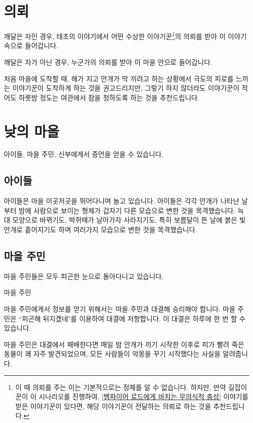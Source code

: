 \documentclass{report}
\begin{document}
	\section{의뢰}
	깨달은 자인 경우, 태초의 이야기에서 어떤 수상한 이야기꾼\footnote{\label{who-is-it}이 때 의뢰를 주는 이는 기본적으로는 정체를 알 수 없습니다. 하지만, 만약 길잡이꾼이 이 시나리오를 진행하여, \hyperlink{vamp-master}{[뱀파이어 로드에게 바치는 무의식적 충성]} 이야기를 받은 이야기꾼이 있다면, 해당 이야기꾼이 전달하는 의뢰로 하는 것을 추천드립니다.}의 의뢰를 받아 이 이야기 속으로 들어갑니다. 
	
	깨달은 자가 아닌 경우, 누군가의 의뢰를 받아 이 마을 안으로 들어갑니다.
	
	처음 마을에 도착할 때, 해가 지고 안개가 막 끼려고 하는 상황에서 극도의 피로를 느끼는 이야기꾼이 도착하게 하는 것을 권고드리지만, 그렇기 하지 않더라도 이야기꾼이 적어도 하룻밤 정도는 여관에서 잠을 청하도록 하는 것을 추천드립니다.
	
	\section{낮의 마을}
	아이들, 마을 주민, 신부에게서 증언을 얻을 수 있습니다.
	
	\subsection{아이들}
	아이들은 마을 이곳저곳을 뛰어다니며 놀고 있습니다. 아이들은 각각 안개가 나타난 날 부터 밤에 사람으로 보이는 형체가 갑자기 다른 모습으로 변한 것을 목격했습니다. 늑대 모양으로 바뀌기도, 박쥐떼가 날아가자 사라지기도, 특히 보름달이 뜬 날에 붉은 빛 안개로 흩어지기도 하며 여러가지 모습으로 변한 것을 목격했습니다.
	
	\subsection{마을 주민}
	마을 주민들은 모두 피곤한 눈으로 돌아다니고 있습니다.
	
	\begin{lite}{마을 주민}
		\subject{수면 부족}
		
	\end{lite}
	
	마을 주민에게서 정보를 얻기 위해서는 마을 주민과 대결해 승리해야 합니다. 마을 주민은 ``피곤해 뒤지겠네"를 이용하여 대결에 저항합니다. 이 대결은 하루에 한 번 할 수 있습니다.
	
	마을 주민은 대결에서 패배한다면 매일 밤 안개가 끼기 시작한 이후로 피가 빨려 죽은 동물이 꽤 자주 발견되었으며, 모든 사람들이 악몽을 꾸기 시작했다는 사실을 알려줍니다.
	
\end{document}
